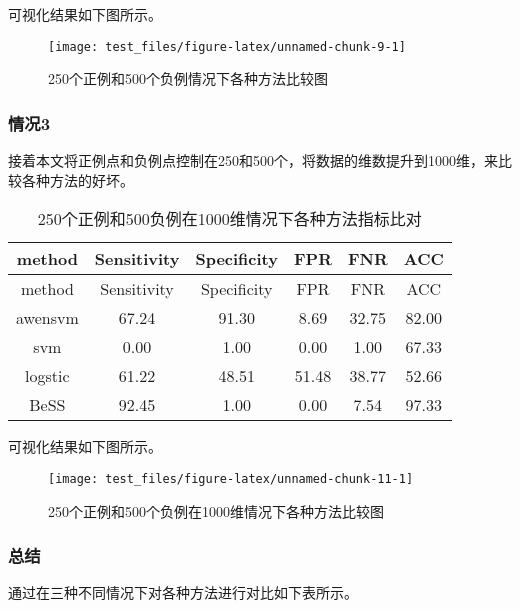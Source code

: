 \documentclass[
]{ctexart}
\begin{document}
可视化结果如下图所示。

\begin{figure}
\texttt{[image: test\_files/figure-latex/unnamed-chunk-9-1]} \caption{250个正例和500个负例情况下各种方法比较图}\label{fig:unnamed-chunk-9}
\end{figure}

\hypertarget{ux60c5ux51b53}{%
\subsubsection{情况3}\label{ux60c5ux51b53}}

接着本文将正例点和负例点控制在250和500个，将数据的维数提升到1000维，来比较各种方法的好坏。

\begin{longtable}[]{@{}cccccc@{}}
\caption{250个正例和500负例在1000维情况下各种方法指标比对}\tabularnewline
\toprule
method & Sensitivity & Specificity & FPR & FNR & ACC \\
\midrule
\endfirsthead
\toprule
method & Sensitivity & Specificity & FPR & FNR & ACC \\
\midrule
\endhead
awensvm & 67.24 & 91.30 & 8.69 & 32.75 & 82.00 \\
svm & 0.00 & 1.00 & 0.00 & 1.00 & 67.33 \\
logstic & 61.22 & 48.51 & 51.48 & 38.77 & 52.66 \\
BeSS & 92.45 & 1.00 & 0.00 & 7.54 & 97.33 \\
\bottomrule
\end{longtable}

可视化结果如下图所示。

\begin{figure}
\texttt{[image: test\_files/figure-latex/unnamed-chunk-11-1]} \caption{250个正例和500个负例在1000维情况下各种方法比较图}\label{fig:unnamed-chunk-11}
\end{figure}

\hypertarget{ux603bux7ed3}{%
\subsubsection{总结}\label{ux603bux7ed3}}

通过在三种不同情况下对各种方法进行对比如下表所示。
\end{document}
